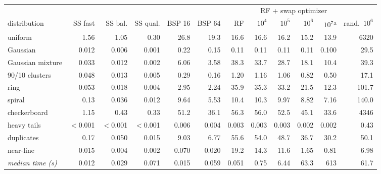 \begin{tabular}{lrrrrrrrrrrr}
\toprule
 & & & & & & & \multicolumn{4}{c}{RF + swap optimizer} & \\
\cmidrule(lr){8-11}
distribution & SS fast & SS bal. & SS qual. & BSP 16 & BSP 64 & RF & $10^4$ & $10^5$ & $10^6$ & $10^7$\textsuperscript{a} & rand.\ $10^6$ \\
\midrule
uniform & 1.56 & 1.05 & 0.30 & 26.8 & 19.3 & 16.6 & 16.6 & 16.2 & 15.2 & 13.9 & 6320 \\
Gaussian & 0.012 & 0.006 & 0.001 & 0.22 & 0.15 & 0.11 & 0.11 & 0.11 & 0.11 & 0.100 & 29.5 \\
Gaussian mixture & 0.033 & 0.012 & 0.002 & 6.06 & 3.58 & 38.3 & 33.7 & 28.7 & 18.1 & 10.4 & 39.3 \\
90/10 clusters & 0.048 & 0.013 & 0.005 & 0.29 & 0.16 & 1.20 & 1.16 & 1.06 & 0.82 & 0.50 & 17.1 \\
ring & 0.053 & 0.018 & 0.004 & 2.95 & 2.24 & 35.9 & 35.3 & 33.2 & 21.5 & 12.3 & 101.7 \\
spiral & 0.13 & 0.036 & 0.012 & 9.64 & 5.53 & 10.4 & 10.3 & 9.97 & 8.82 & 7.16 & 140.0 \\
checkerboard & 1.15 & 0.43 & 0.33 & 51.2 & 36.1 & 56.3 & 56.0 & 52.5 & 45.1 & 33.6 & 4346 \\
heavy tails & $<$0.001 & $<$0.001 & $<$0.001 & 0.006 & 0.004 & 0.003 & 0.003 & 0.003 & 0.002 & 0.002 & 0.43 \\
duplicates & 0.17 & 0.050 & 0.015 & 9.03 & 6.77 & 55.6 & 54.0 & 48.7 & 36.7 & 30.2 & 50.1 \\
near-line & 0.015 & 0.004 & 0.002 & 0.070 & 0.020 & 19.2 & 14.3 & 11.6 & 1.65 & 0.81 & 6.98 \\
\midrule
\emph{median time (s)} & 0.012 & 0.029 & 0.071 & 0.015 & 0.059 & 0.051 & 0.75 & 6.44 & 63.3 & 613 & 61.7 \\
\bottomrule
\end{tabular}

